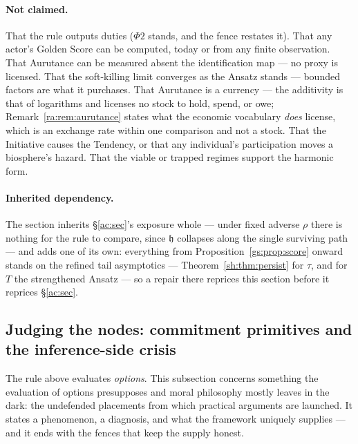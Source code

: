 \documentclass[11pt]{article}
\numberwithin{equation}{section}
\theoremstyle{plain}
\theoremstyle{definition}
\theoremstyle{remark}
\newcommand{\hm}{\mathfrak{h}}
\begin{document}
\paragraph{Not claimed.} That the rule outputs duties ($\Phi2$ stands, and the fence restates it). That any actor's Golden Score can be computed, today or from any finite observation. That Aurutance can be measured absent the identification map --- no proxy is licensed. That the soft-killing limit converges as the Ansatz stands --- bounded factors are what it purchases. That Aurutance is a currency --- the additivity is that of logarithms and licenses no stock to hold, spend, or owe; Remark~\ref{ra:rem:aurutance} states what the economic vocabulary \emph{does} license, which is an exchange rate within one comparison and not a stock. That the Initiative causes the Tendency, or that any individual's participation moves a biosphere's hazard. That the viable or trapped regimes support the harmonic form.

\paragraph{Inherited dependency.} The section inherits \S\ref{ac:sec}'s exposure whole --- under fixed adverse $\rho$ there is nothing for the rule to compare, since $\hm$ collapses along the single surviving path --- and adds one of its own: everything from Proposition~\ref{gs:prop:score} onward stands on the refined tail asymptotics --- Theorem~\ref{sh:thm:persist} for $\tau$, and for $T$ the strengthened Ansatz --- so a repair there reprices this section before it reprices \S\ref{ac:sec}.

\subsection{Judging the nodes: commitment primitives and the
inference-side crisis}\label{gs:sub:nodes}

The rule above evaluates \emph{options}. This subsection concerns
something the evaluation of options presupposes and moral philosophy
mostly leaves in the dark: the undefended placements from which
practical arguments are launched. It states a phenomenon, a diagnosis,
and what the framework uniquely supplies --- and it ends with the
fences that keep the supply honest.
\end{document}
